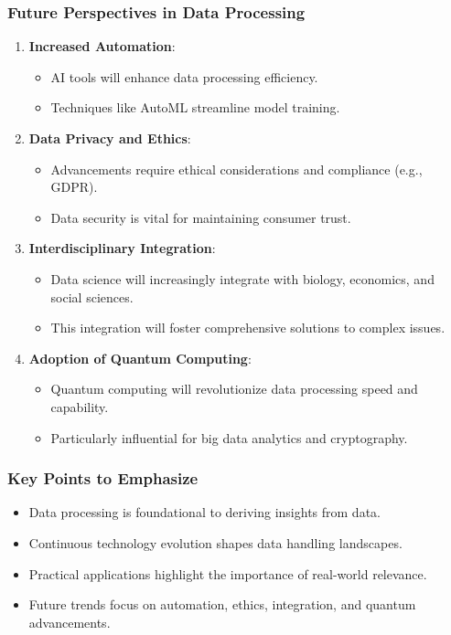 \documentclass[aspectratio=169]{beamer}
\begin{document}
\begin{frame}[fragile]
    \frametitle{Future Perspectives in Data Processing}
    
    \begin{enumerate}
        \item \textbf{Increased Automation}:
            \begin{itemize}
                \item AI tools will enhance data processing efficiency.
                \item Techniques like AutoML streamline model training.
            \end{itemize}
        \item \textbf{Data Privacy and Ethics}:
            \begin{itemize}
                \item Advancements require ethical considerations and compliance (e.g., GDPR).
                \item Data security is vital for maintaining consumer trust.
            \end{itemize}
        \item \textbf{Interdisciplinary Integration}:
            \begin{itemize}
                \item Data science will increasingly integrate with biology, economics, and social sciences.
                \item This integration will foster comprehensive solutions to complex issues.
            \end{itemize}
        \item \textbf{Adoption of Quantum Computing}:
            \begin{itemize}
                \item Quantum computing will revolutionize data processing speed and capability.
                \item Particularly influential for big data analytics and cryptography.
            \end{itemize}
    \end{enumerate}
\end{frame}

\begin{frame}[fragile]
    \frametitle{Key Points to Emphasize}
    
    \begin{itemize}
        \item Data processing is foundational to deriving insights from data.
        \item Continuous technology evolution shapes data handling landscapes.
        \item Practical applications highlight the importance of real-world relevance.
        \item Future trends focus on automation, ethics, integration, and quantum advancements.
    \end{itemize}
\end{frame}
\end{document}
